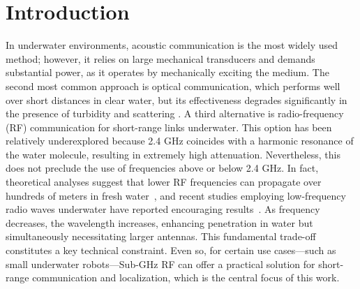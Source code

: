 \documentclass[subscriptcorrection,upint,varvw,barcolor=Goldenrod3,mathalfa=cal=euler,balance,hyphenate,pdf-a]{asmejour}
\begin{document}
\section{Introduction}

In underwater environments, acoustic communication is the most widely used method; however, it relies on large mechanical transducers and demands substantial power, as it operates by mechanically exciting the medium. The second most common approach is optical communication, which performs well over short distances in clear water, but its effectiveness degrades significantly in the presence of turbidity and scattering \cite{Partan2007}. A third alternative is radio-frequency (RF) communication for short-range links underwater. This option has been relatively underexplored because 2.4 GHz coincides with a harmonic resonance of the water molecule, resulting in extremely high attenuation. Nevertheless, this does not preclude the use of frequencies above or below 2.4 GHz. In fact, theoretical analyses suggest that lower RF frequencies can propagate over hundreds of meters in fresh water~\cite{Palmeiro2011UnderwaterRF}, and recent studies employing low-frequency radio waves underwater have reported encouraging results~\cite{Nguyen2019}. As frequency decreases, the wavelength increases, enhancing penetration in water but simultaneously necessitating larger antennas. This fundamental trade-off constitutes a key technical constraint. Even so, for certain use cases—such as small underwater robots—Sub-GHz RF can offer a practical solution for short-range communication and localization, which is the central focus of this work.
\end{document}
